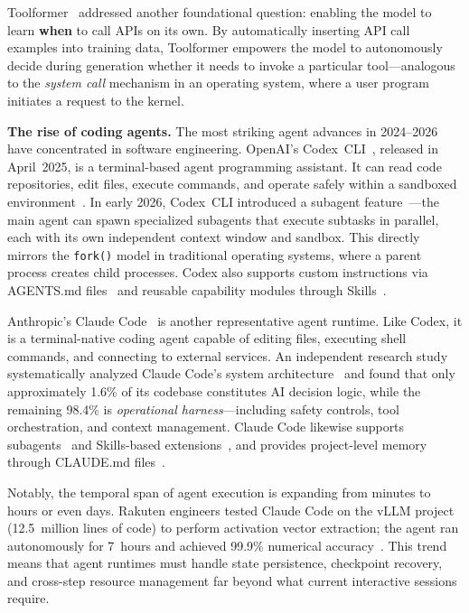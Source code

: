\documentclass[11pt,a4paper]{article}
\begin{document}
Toolformer~\cite{schick2023toolformer} addressed another foundational question: enabling the model to learn \textbf{when} to call APIs on its own.
By automatically inserting API call examples into training data, Toolformer empowers the model to autonomously decide during generation whether it needs to invoke a particular tool---analogous to the \textit{system call} mechanism in an operating system, where a user program initiates a request to the kernel.

\textbf{The rise of coding agents.}
The most striking agent advances in 2024--2026 have concentrated in software engineering.
OpenAI's Codex~CLI~\cite{openai_codex_overview_2026}, released in April~2025, is a terminal-based agent programming assistant.
It can read code repositories, edit files, execute commands, and operate safely within a sandboxed environment~\cite{openai_codex_sandbox_2026}.
In early 2026, Codex~CLI introduced a subagent feature~\cite{openai_codex_subagents_2026}---the main agent can spawn specialized subagents that execute subtasks in parallel, each with its own independent context window and sandbox.
This directly mirrors the \texttt{fork()} model in traditional operating systems, where a parent process creates child processes.
Codex also supports custom instructions via AGENTS.md files~\cite{openai_codex_agents_md_2026} and reusable capability modules through Skills~\cite{openai_codex_skills_2026}.

Anthropic's Claude Code~\cite{anthropic_claudecode_overview_2026} is another representative agent runtime.
Like Codex, it is a terminal-native coding agent capable of editing files, executing shell commands, and connecting to external services.
An independent research study systematically analyzed Claude Code's system architecture~\cite{dive_claudecode_2026} and found that only approximately 1.6\% of its codebase constitutes AI decision logic, while the remaining 98.4\% is \textit{operational harness}---including safety controls, tool orchestration, and context management.
Claude Code likewise supports subagents~\cite{anthropic_claudecode_subagents_2026} and Skills-based extensions~\cite{anthropic_claudecode_skills_2026}, and provides project-level memory through CLAUDE.md files~\cite{anthropic_claudecode_memory_2026}.

Notably, the temporal span of agent execution is expanding from minutes to hours or even days.
Rakuten engineers tested Claude Code on the vLLM project (12.5~million lines of code) to perform activation vector extraction; the agent ran autonomously for 7~hours and achieved 99.9\% numerical accuracy~\cite{anthropic2026agenticreport}.
This trend means that agent runtimes must handle state persistence, checkpoint recovery, and cross-step resource management far beyond what current interactive sessions require.
\end{document}
